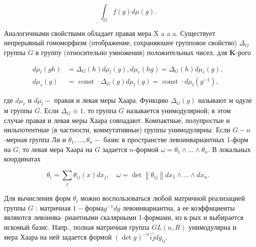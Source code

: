\documentclass[10pt]{article}
\begin{document}
\[

\int_{G} f(g) d \mu(g) .

\]



Аналогичными свойствами обладает правая мера $\mathrm{X}$ a a a. Существует непрерывный гомоморфизм (отображение, сохраняюшее групповое свойство) $\Delta_{G}$ группы $G$ в группу (относительно умножения) положительных чисел, для $\mathbf{K}$-рого



\[

\begin{aligned}

d \mu_{l}(g h) & =\Delta_{G}(h) d \mu_{l}(g), d \mu_{r}(h g)=\Delta_{G}(h) d \mu_{r}(g), \\

d \mu_{r}(g) & =\text { const } \cdot \Delta_{G}(g) d \mu_{l}(g)=\text { const } \cdot d \mu_{l}\left(g^{-1}\right),

\end{aligned}

\]



где $d \mu_{r}$ и $d \mu_{l}-$ правая и левая меры Хаара. Функцию $\Delta_{G}(g)$ называют м одуле м группы $G$. Если $\Delta_{G} \equiv 1$, то группа $G$ называется унимодулярной; в этом случае правая и левая меры Хаара совпадают. Компактные, полупростые и нильпотентные (в частности, коммутативные) группы унимодулярны. Если $G-n$-мерная группа Ли и $\theta_{1}, \ldots, \theta_{n}-$ базис в пространстве левоинвариантных 1-форм на $G$, то левая мера Хаара на $G$ задается $n$-формой $\omega=\theta_{1} \wedge \ldots \wedge \theta_{n}$. В локальных координатах



\[

\theta_{i}=\sum_{j} \theta_{i j}(x) d x_{j}, \quad \omega=\operatorname{det}\left\|\theta_{i j}\right\| d x_{1} \wedge \ldots \wedge d x_{n} .

\]



Для вычисления форм $\theta_{i}$ можно воспользоваться любой матричной реализацией группы $G$ : матричная $1-ф о р м а g^{-1} d g$ левоинвариантна, а ее коэффициенты являются левоинва- риантными скалярными 1-формами, из к-рых и выбирается искомый базис. Напр., полная матричная группа $G L(n, R)$ унимодулярна и мера Хаара на ней задается формой $(\operatorname{det} g)^{-n} \hat{i j} d g_{i j}$.
\end{document}
